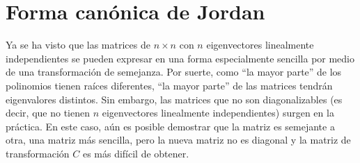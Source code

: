 \section{Forma canónica de Jordan}

Ya se ha visto que las matrices de $n \times n$ con $n$ eigenvectores linealmente independientes se pueden expresar en una forma especialmente sencilla por medio de una transformación de semejanza. Por suerte, como “la mayor parte” de los polinomios tienen raíces diferentes, “la mayor parte” de las matrices tendrán eigenvalores distintos. Sin embargo, las matrices que no son diagonalizables (es decir, que no tienen $n$ eigenvectores linealmente independientes) surgen en la práctica. En este caso, aún es posible demostrar que la matriz es semejante a otra, una matriz más sencilla, pero la nueva matriz no es diagonal y la matriz de transformación $C$ es más difícil de obtener.

